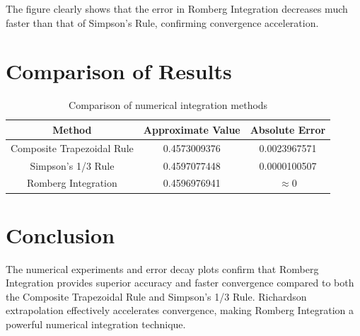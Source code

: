 \documentclass[12pt]{article}
\begin{document}
The figure clearly shows that the error in Romberg Integration decreases much faster
than that of Simpson’s Rule, confirming convergence acceleration.

\section{Comparison of Results}

\begin{table}[H]
\centering
\begin{tabular}{c c c}
\toprule
Method & Approximate Value & Absolute Error \\
\midrule
Composite Trapezoidal Rule & 0.4573009376 & 0.0023967571 \\
Simpson’s 1/3 Rule & 0.4597077448 & 0.0000100507 \\
Romberg Integration & 0.4596976941 & $\approx 0$ \\
\bottomrule
\end{tabular}
\caption{Comparison of numerical integration methods}
\end{table}

\section{Conclusion}

The numerical experiments and error decay plots confirm that Romberg Integration
provides superior accuracy and faster convergence compared to both the Composite
Trapezoidal Rule and Simpson’s 1/3 Rule. Richardson extrapolation effectively
accelerates convergence, making Romberg Integration a powerful numerical
integration technique.
\end{document}
